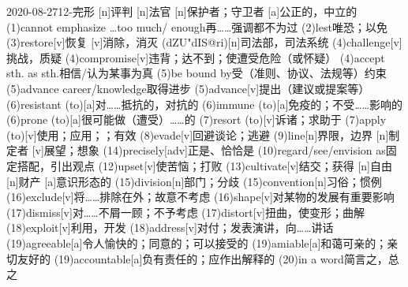 \documentclass[12pt]{ctexart}
\begin{document}
\begin{wordlist}{2020-08-27}{12-完形}
  [n]{评判}
  [n]{法官}
  [n]{保护者；守卫者}
  [a]{公正的，中立的}
  \word(1){cannot emphasize \dots too much/ enough}{再……强调都不为过}
  \word(2){lest}{唯恐；以免}
  \word[2020-09-11](3){restore}[v]{恢复}
  [v]{消除，消灭}
  (dZU"dIS@ri)[n]{司法部，司法系统}
  \word(4){challenge}[v]{挑战，质疑}
  \word[2020-11-02](4){compromise}[v]{违背；达不到；使遭受危险（或怀疑）}
  \word(4){accept sth. as sth.}{相信/认为某事为真}
  \word[2020-09-03](5){be bound by}{受（准则、协议、法规等）约束}
  \word(5){advance career/knowledge}{取得进步}
  \word[2020-09-21](5){advance}[v]{提出（建议或提案等）}
  \word(6){resistant (to)}[a]{对……抵抗的，对抗的}
  \word(6){immune (to)}[a]{免疫的；不受……影响的}
  \word[2020-08-29](6){prone (to)}[a]{很可能做（遭受）……的}
  \word(7){resort (to)}[v]{诉诸；求助于}
  \word(7){apply (to)}[v]{使用；应用；；有效}
  \word(8){evade}[v]{回避谈论；逃避}
  \word(9){line}[n]{界限，边界}
  [n]{制定者}
  [v]{展望；想象}
  \word(14){precisely}[adv]{正是、恰恰是}
  \word(10){regard/see/envision as}{固定搭配，引出观点}
  \word(12){upset}[v]{使苦恼；打败}
  \word(13){cultivate}[v]{结交；获得}
  [n]{自由}
  [n]{财产}
  [a]{意识形态的}
  \word(15){division}[n]{部门；分歧}
  \word(15){convention}[n]{习俗；惯例}
  \word(16){exclude}[v]{将……排除在外；故意不考虑}
  \word(16){shape}[v]{对某物的发展有重要影响}
  \word(17){dismiss}[v]{对……不屑一顾；不予考虑}
  \word[2020-08-29](17){distort}[v]{扭曲，使变形；曲解}
  \word[2020-08-29](18){exploit}[v]{利用，开发}
  \word[2020-11-20](18){address}[v]{对付；发表演讲，向……讲话}
  \word(19){agreeable}[a]{令人愉快的；同意的；可以接受的}
  \word[2020-08-31](19){amiable}[a]{和蔼可亲的；亲切友好的}
  \word[2020-08-29](19){accountable}[a]{负有责任的；应作出解释的}
  \word(20){in a word}{简言之，总之}
\end{wordlist}
\end{document}
